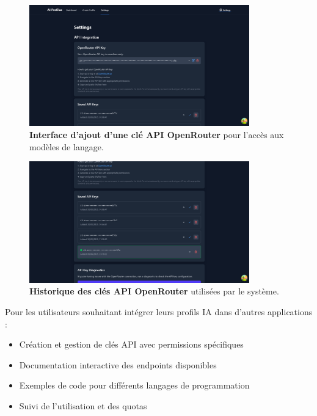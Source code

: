 \begin{figure}[H]
  \centering
  \includegraphics[width=0.85\textwidth,keepaspectratio]{pfe-pics/ai-profile-creation/adding_openRouter_api.png}
  \caption{\textbf{Interface d'ajout d'une clé API OpenRouter} pour l'accès aux modèles de langage.}
  \label{fig:openrouter_api_addition}
\end{figure}

\begin{figure}[H]
  \centering
  \includegraphics[width=0.85\textwidth,keepaspectratio]{pfe-pics/ai-profile-creation/oneRouter_keys_hestory.png}
  \caption{\textbf{Historique des clés API OpenRouter} utilisées par le système.}
  \label{fig:api_keys_history}
\end{figure}

Pour les utilisateurs souhaitant intégrer leurs profils IA dans d'autres applications :

\begin{itemize}
  \item Création et gestion de clés API avec permissions spécifiques
  \item Documentation interactive des endpoints disponibles
  \item Exemples de code pour différents langages de programmation
  \item Suivi de l'utilisation et des quotas
\end{itemize}

